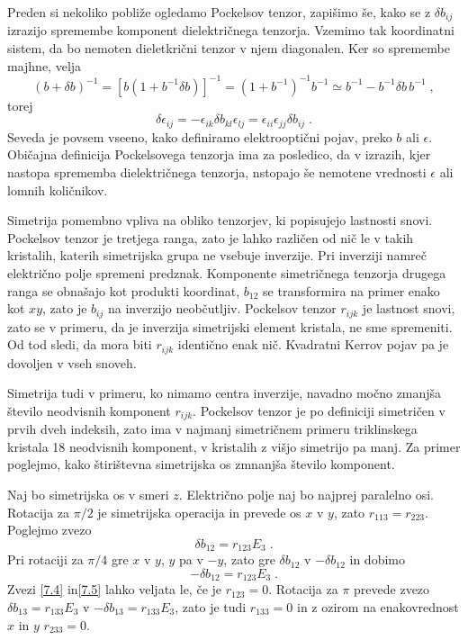 \documentclass[11pt,fleqn]{book} %
\begin{document}
Preden si nekoliko pobliže ogledamo Pockelsov tenzor, zapišimo še,
kako se z $\delta b_{ij}$ izrazijo spremembe komponent dielektričnega
tenzorja. Vzemimo tak koordinatni sistem, da bo nemoten dieletkrični
tenzor v njem diagonalen. Ker so spremembe majhne, velja 
\begin{equation}
(b+\delta b)^{-1}=[b(1+b^{-1}\delta b)]^{-1}=(1+b^{-1})^{-1}b^{-1}\simeq b^{-1}-b^{-1}\delta b\, b^{-1}\;,\label{7.2}
\end{equation}
 torej 
\begin{equation}
\delta\epsilon_{ij}=-\epsilon_{ik}\delta b_{kl}\epsilon_{lj}=\epsilon_{ii}\epsilon_{jj}\delta b_{ij}\;.\label{7.3}
\end{equation}
 Seveda je povsem vseeno, kako definiramo elektrooptični pojav, preko
$b$ ali $\epsilon$. Običajna definicija Pockelsovega tenzorja ima
za posledico, da v izrazih, kjer nastopa sprememba dielektričnega
tenzorja, nstopajo še nemotene vrednosti $\epsilon$ ali lomnih količnikov.

Simetrija pomembno vpliva na obliko tenzorjev, ki popisujejo lastnosti
snovi. Pockelsov tenzor je tretjega ranga, zato je lahko različen
od nič le v takih kristalih, katerih simetrijska grupa ne vsebuje
inverzije. Pri inverziji namreč električno polje spremeni predznak.
Komponente simetričnega tenzorja drugega ranga se obnašajo kot produkti
koordinat, $b_{12}$ se transformira na primer enako kot $xy$, zato
je $b_{ij}$ na inverzijo neobčutljiv. Pockelsov tenzor $r_{ijk}$
je lastnost snovi, zato se v primeru, da je inverzija simetrijski
element kristala, ne sme spremeniti. Od tod sledi, da mora biti $r_{ijk}$
identično enak nič. Kvadratni Kerrov pojav pa je dovoljen v vseh snoveh.

Simetrija tudi v primeru, ko nimamo centra inverzije, navadno močno
zmanjša število neodvisnih komponent $r_{ijk}$. Pockelsov tenzor
je po definiciji simetričen v prvih dveh indeksih, zato ima v najmanj
simetričnem primeru triklinskega kristala 18 neodvisnih komponent,
v kristalih z višjo simetrijo pa manj. Za primer poglejmo, kako štirištevna
simetrijska os zmnanjša število komponent.

Naj bo simetrijska os v smeri $z$. Električno polje naj bo najprej
paralelno osi. Rotacija za $\pi/2$ je simetrijska operacija in prevede
os $x$ v $y$, zato $r_{113}=r_{223}$. Poglejmo zvezo 
\begin{equation}
\delta b_{12}=r_{123}E_{3}\;.\label{7.4}
\end{equation}
 Pri rotaciji za $\pi/4$ gre $x$ v $y$, $y$ pa v $-y$, zato gre
$\delta b_{12}$ v $-\delta b_{12}$ in dobimo 
\begin{equation}
-\delta b_{12}=r_{123}E_{3}\;.\label{7.5}
\end{equation}
 Zvezi \ref{7.4} in\ref{7.5} lahko veljata le, če je $r_{123}=0$.
Rotacija za $\pi$ prevede zvezo $\delta b_{13}=r_{133}E_{3}$ v $-\delta b_{13}=r_{133}E_{3}$,
zato je tudi $r_{133}=0$ in z ozirom na enakovrednost $x$ in $y$
$r_{233}=0$.
\end{document}
